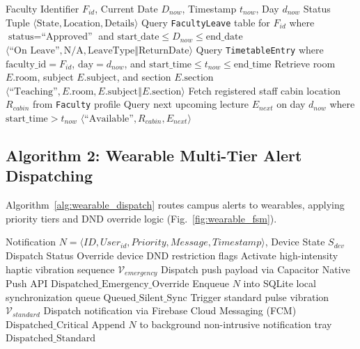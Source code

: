 \documentclass[conference]{IEEEtran}
\begin{document}
\begin{algorithm}[htbp]
\caption{Efficient Indexed Faculty Status Resolution}
\label{alg:faculty_resolution}
\begin{algorithmic}[1]
\REQUIRE Faculty Identifier $F_{id}$, Current Date $D_{now}$, Timestamp $t_{now}$, Day $d_{now}$
\ENSURE Status Tuple $\langle \text{State}, \text{Location}, \text{Details} \rangle$
\STATE Query \texttt{FacultyLeave} table for $F_{id}$ where $\text{status} = \text{``Approved''}$ and $\text{start\_date} \le D_{now} \le \text{end\_date}$
    \RETURN $\langle \text{``On Leave''}, \text{N/A}, \text{LeaveType} \mathbin{\Vert} \text{ReturnDate} \rangle$
\ENDIF
\STATE Query \texttt{TimetableEntry} where $\text{faculty\_id} = F_{id}$, $\text{day} = d_{now}$, and $\text{start\_time} \le t_{now} \le \text{end\_time}$
    \STATE Retrieve room $E.\text{room}$, subject $E.\text{subject}$, and section $E.\text{section}$
    \RETURN $\langle \text{``Teaching''}, E.\text{room}, E.\text{subject} \mathbin{\Vert} E.\text{section} \rangle$
\ELSE
    \STATE Fetch registered staff cabin location $R_{cabin}$ from \texttt{Faculty} profile
    \STATE Query next upcoming lecture $E_{next}$ on day $d_{now}$ where $\text{start\_time} > t_{now}$
    \RETURN $\langle \text{``Available''}, R_{cabin}, E_{next} \rangle$
\ENDIF
\end{algorithmic}
\end{algorithm}

\subsection{Algorithm 2: Wearable Multi-Tier Alert Dispatching}
Algorithm~\ref{alg:wearable_dispatch} routes campus alerts to wearables, applying priority tiers and DND override logic (Fig.~\ref{fig:wearable_fsm}).

\begin{algorithm}[htbp]
\caption{Wearable Priority Alert Dispatching}
\label{alg:wearable_dispatch}
\begin{algorithmic}[1]
\REQUIRE Notification $N = \langle ID, User_{id}, Priority, Message, Timestamp \rangle$, Device State $S_{dev}$
\ENSURE Dispatch Status
    \STATE Override device DND restriction flags
    \STATE Activate high-intensity haptic vibration sequence $\mathcal{V}_{emergency}$
    \STATE Dispatch push payload via Capacitor Native Push API
    \RETURN $\text{Dispatched\_Emergency\_Override}$
        \STATE Enqueue $N$ into SQLite local synchronization queue
        \RETURN $\text{Queued\_Silent\_Sync}$
    \ELSE
        \STATE Trigger standard pulse vibration $\mathcal{V}_{standard}$
        \STATE Dispatch notification via Firebase Cloud Messaging (FCM)
        \RETURN $\text{Dispatched\_Critical}$
    \ENDIF
\ELSE
    \STATE Append $N$ to background non-intrusive notification tray
    \RETURN $\text{Dispatched\_Standard}$
\ENDIF
\end{algorithmic}
\end{algorithm}
\end{document}
